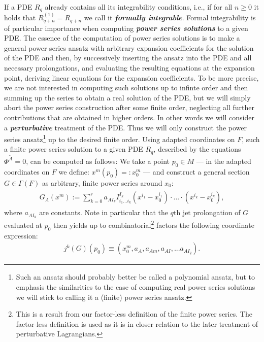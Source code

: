 If a PDE $R_q$ already contains all its integrability conditions, i.e., if for all $n\geq 0$ it holds that $R_{q+n}^{(1)} = R_{q+n}$ we call it \textit{\textbf{formally integrable}}.
Formal integrability is of particular importance when computing \textbf{\textit{power series solutions}} to a given PDE. The essence of the computation of power series solutions is to make a general power series ansatz with arbitrary expansion coefficients for the solution of the PDE and then, by successively inserting the ansatz into the PDE and all necessary prolongations, and evaluating the resulting equations at the expansion point, deriving linear equations for the expansion coefficients. 
To be more precise, we are not interested in computing such solutions up to infinte order and then summing up the series to obtain a real solution of the PDE, but we will simply abort the power series construction after some finite order, neglecting all further contributions that are obtained in higher orders.
In other words we will consider a \textit{\textbf{perturbative}} treatment of the PDE.
Thus we will only construct the power series ansatz\footnote{Such an ansatz should probably better be called a polynomial ansatz, but to emphasis the similarities to the case of computing real power series solutions we will stick to calling it a (finite) power series ansatz.} up to the desired finite order.
Using adapted coordinates on $F$, such a finite power series solution to a given PDE $R_q$, described by the equations $\Phi^{\tilde{A}} = 0$, can be computed as follows: We take a point $p_0 \in M$ --- in the adapted coordinates on $F$ we define: $x^m(p_0) =: x_0^m$ --- and construct a general section $G\in\Gamma(F)$ as arbitrary, finite power series around $x_0$:
\begin{align}
\begin{aligned}
    G_A(x^m) :=  \sum_{k=0}^{r} a_{AI_k}I^{I_k}_{i_1...i_k}(x^{i_1}-x_0^{i_1}) \cdot ... \cdot (x^{i_k}- x_0^{i_k}), 
\end{aligned}
\end{align}
where $a_{AI_k}$ are constants. Note in particular that the $q$th jet prolongation of $G$ evaluated at $p_0$ then yields up to combinatorial\footnote{This is a result from our factor-less definition of the finite power series. The factor-less definition is used as it is in closer relation to the later treatment of perturbative Lagrangians.} factors the following coordinate expression:
\begin{align}
    j^k(G)(p_0) \equiv \left ( x_0^m, a_A, a_{Am}, a_{AI}, ... a_{AI_q} \right ).
\end{align}
